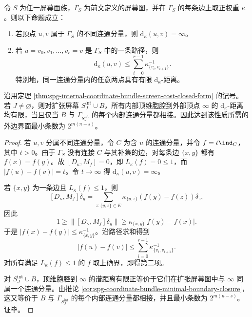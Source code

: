 \begin{theorem}[屏幕闭合的交换子距离判据]\label{thm:distill-connes-screen-commutator-distance-closure}
令 \(S\) 为任一屏幕面族，\(\Gamma_S\) 为前文定义的屏幕图，并在 \(\Gamma_S\) 的每条边上取正权重 \(\kappa\)。则以下命题成立：
\begin{enumerate}
  \item 若顶点 \(u,v\) 属于 \(\Gamma_S\) 的不同连通分量，则 \(\mathrm d_{\kappa}(u,v)=\infty\)。
  \item 若 \(u=v_0,v_1,\ldots,v_r=v\) 是 \(\Gamma_S\) 中的一条路径，则
  \[
  \mathrm d_{\kappa}(u,v)\le \sum_{i=0}^{r-1}\kappa_{\{v_i,v_{i+1}\}}^{-1}.
  \]
  特别地，同一连通分量内的任意两点具有有限 \(\mathrm d_{\kappa}\)-距离。
\end{enumerate}
沿用定理 \ref{thm:spg-internal-coordinate-bundle-screen-cost-closed-form} 的记号。若 \(J\ne\varnothing\)，则对扩张屏幕 \(S_J^{\mathrm{int}}\cup B\)，所有内部顶维胞腔到外部顶点 \(\infty\) 的 \(\mathrm d_{\kappa}\)-距离均有限，当且仅当 \(B\) 与 \(\Gamma_{S_J^{\mathrm{int}}}\) 的每个内部连通分量都相接。因此达到该性质所需的外边界面最小条数为 \(2^{m(n-s)}\)。
\end{theorem}
\begin{proof}
若 \(u,v\) 分属不同连通分量，令 \(C\) 为含 \(u\) 的连通分量，并令 \(f=t\ind_C\)，其中 \(t>0\)。由于 \(\Gamma_S\) 没有连接 \(C\) 与其补集的边，对每条边 \(\{x,y\}\) 都有 \(f(x)=f(y)\)。故 \([D_{\kappa},M_f]=0\)，即 \(L_{\kappa}(f)=0\le1\)，而 \(|f(u)-f(v)|=t\)。令 \(t\to\infty\) 得 \(\mathrm d_{\kappa}(u,v)=\infty\)。

若 \(\{x,y\}\) 为一条边且 \(L_{\kappa}(f)\le1\)，则
\[
[D_{\kappa},M_f]\delta_y
=\sum_{z:\{y,z\}\in E}\kappa_{\{y,z\}}(f(y)-f(z))\delta_z,
\]
因此
\[
1\ge \|[D_{\kappa},M_f]\delta_y\|\ge
\kappa_{\{x,y\}}|f(y)-f(x)|.
\]
于是 \(|f(x)-f(y)|\le\kappa_{\{x,y\}}^{-1}\)。沿路径求和得到
\[
|f(u)-f(v)|\le \sum_{i=0}^{r-1}\kappa_{\{v_i,v_{i+1}\}}^{-1}.
\]
对所有满足 \(L_{\kappa}(f)\le1\) 的 \(f\) 取上确界，即得第二项。

对 \(S_J^{\mathrm{int}}\cup B\)，顶维胞腔到 \(\infty\) 的谱距离有限正等价于它们在扩张屏幕图中与 \(\infty\) 同属一个连通分量。由推论 \ref{cor:spg-coordinate-bundle-minimal-boundary-closure}，这又等价于 \(B\) 与 \(\Gamma_{S_J^{\mathrm{int}}}\) 的每个内部连通分量都相接，并且最小条数为 \(2^{m(n-s)}\)。证毕。
\end{proof}

\endinput
